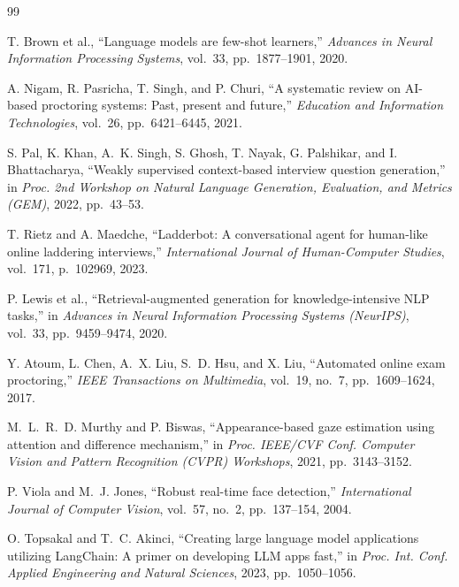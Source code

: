 \documentclass[12pt,a4paper]{report}
\begin{document}
\begin{thebibliography}{99}

T. Brown et al., ``Language models are few-shot learners,''
\textit{Advances in Neural Information Processing Systems},
vol.~33, pp.~1877--1901, 2020.

A. Nigam, R. Pasricha, T. Singh, and P. Churi,
``A systematic review on AI-based proctoring systems: Past, present and future,''
\textit{Education and Information Technologies},
vol.~26, pp.~6421--6445, 2021.

S. Pal, K. Khan, A.~K. Singh, S. Ghosh, T. Nayak, G. Palshikar, and
I. Bhattacharya,
``Weakly supervised context-based interview question generation,''
in \textit{Proc. 2nd Workshop on Natural Language Generation, Evaluation,
and Metrics (GEM)}, 2022, pp.~43--53.

T. Rietz and A. Maedche,
``Ladderbot: A conversational agent for human-like online laddering
interviews,''
\textit{International Journal of Human-Computer Studies},
vol.~171, p.~102969, 2023.

P. Lewis et al.,
``Retrieval-augmented generation for knowledge-intensive NLP tasks,''
in \textit{Advances in Neural Information Processing Systems (NeurIPS)},
vol.~33, pp.~9459--9474, 2020.

Y. Atoum, L. Chen, A.~X. Liu, S.~D. Hsu, and X. Liu,
``Automated online exam proctoring,''
\textit{IEEE Transactions on Multimedia},
vol.~19, no.~7, pp.~1609--1624, 2017.

M.~L.~R.~D. Murthy and P. Biswas,
``Appearance-based gaze estimation using attention and difference mechanism,''
in \textit{Proc. IEEE/CVF Conf. Computer Vision and Pattern Recognition
(CVPR) Workshops}, 2021, pp.~3143--3152.

P. Viola and M.~J. Jones,
``Robust real-time face detection,''
\textit{International Journal of Computer Vision},
vol.~57, no.~2, pp.~137--154, 2004.

O. Topsakal and T.~C. Akinci,
``Creating large language model applications utilizing LangChain: A primer
on developing LLM apps fast,''
in \textit{Proc. Int. Conf. Applied Engineering and Natural Sciences},
2023, pp.~1050--1056.


\end{thebibliography}
\end{document}
